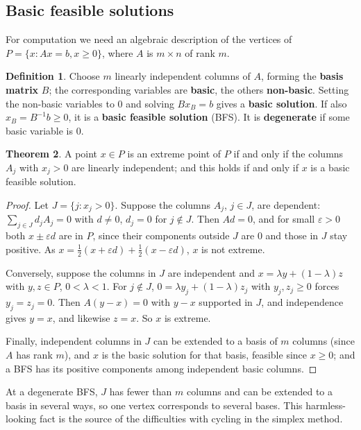 \documentclass[11pt,a4paper]{article}
\numberwithin{equation}{section}
\theoremstyle{definition}
\newtheorem{thm}{Theorem}[subsection]
\newtheorem{defn}[thm]{Definition}
\begin{document}
\subsection{Basic feasible solutions}
\label{ssec:bfs}

For computation we need an algebraic description of the vertices of $P = \{x : Ax = b, x \geq 0\}$, where $A$ is $m \times n$ of rank $m$.

\begin{defn}
Choose $m$ linearly independent columns of $A$, forming the \textbf{basis matrix} $B$; the corresponding variables are \textbf{basic}, the others \textbf{non-basic}. Setting the non-basic variables to $0$ and solving $Bx_B = b$ gives a \textbf{basic solution}. If also $x_B = B^{-1}b \geq 0$, it is a
\textbf{basic feasible solution} (BFS). It is \textbf{degenerate} if some basic variable is $0$.
\end{defn}

\begin{thm}
\label{thm:bfs}
A point $x \in P$ is an extreme point of $P$ if and only if the columns $A_j$ with $x_j > 0$ are linearly independent; and this holds if and only if $x$ is a basic feasible solution.
\end{thm}

\begin{proof}
Let $J = \{j : x_j > 0\}$. Suppose the columns $A_j$, $j \in J$, are dependent: $\sum_{j \in J}d_jA_j = 0$ with $d \neq 0$, $d_j = 0$ for $j \notin J$. Then $Ad = 0$, and for small $\varepsilon > 0$ both $x \pm \varepsilon d$ are in $P$, since their components outside $J$ are $0$ and those in $J$ stay positive. As
$x = \frac12(x + \varepsilon d) + \frac12(x - \varepsilon d)$, $x$ is not extreme.

Conversely, suppose the columns in $J$ are independent and $x = \lambda y + (1 - \lambda)z$ with $y, z \in P$, $0 < \lambda < 1$. For $j \notin J$, $0 = \lambda y_j + (1 - \lambda)z_j$ with $y_j, z_j \geq 0$ forces $y_j = z_j = 0$. Then $A(y - x) = 0$ with $y - x$ supported in $J$, and independence gives $y = x$, and
likewise $z = x$. So $x$ is extreme.

Finally, independent columns in $J$ can be extended to a basis of $m$ columns (since $A$ has rank $m$), and $x$ is the basic solution for that basis, feasible since $x \geq 0$; and a BFS has its positive components among independent basic columns.
\end{proof}

At a degenerate BFS, $J$ has fewer than $m$ columns and can be extended to a basis in several ways, so one vertex corresponds to several bases. This harmless-looking fact is the source of the difficulties with cycling in the simplex method.
\end{document}

